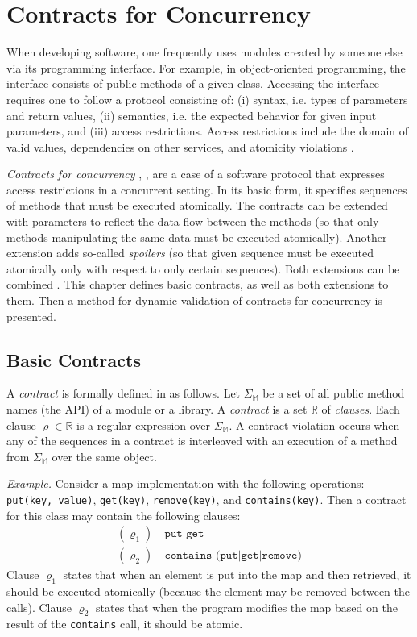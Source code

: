 \chapter{Contracts for Concurrency}
\label{chThree}

When developing software, one frequently uses modules created by someone else
via its programming interface. For example, in object-oriented programming, the
interface consists of public methods of a given class. Accessing the interface
requires one to follow a protocol consisting of: (i) syntax, i.e. types of
parameters and return values, (ii) semantics, i.e. the expected behavior for
given input parameters, and (iii) access restrictions. Access restrictions
include the domain of valid values, dependencies on other services, and
atomicity violations \cite{contracts}.

\emph{Contracts for concurrency} \cite{FITPUB10817},
\cite{DBLP:journals/corr/SousaDFL15}, are a case of a software protocol that
expresses access restrictions in a concurrent setting. In its basic form, it
specifies sequences of methods that must be executed atomically. The contracts
can be extended with parameters to reflect the data flow between the methods (so
that only methods manipulating the same data must be executed atomically).
Another extension adds so-called \emph{spoilers} (so that given sequence must be
executed atomically only with respect to only certain sequences). Both
extensions can be combined \cite{contracts}. This chapter defines basic
contracts, as well as both extensions to them. Then a method for dynamic
validation of contracts for concurrency is presented.

\section{Basic Contracts}
\label{basicContracts}

A \emph{contract} is formally defined in \cite{FITPUB10817} as follows. Let
$\Sigma_\mathbb{M}$ be a set of all public method names (the API) of a module or
a library. A \emph{contract} is a set $\mathbb{R}$ of \emph{clauses}. Each
clause $\varrho \in \mathbb{R}$ is a regular expression over
$\Sigma_\mathbb{M}$. A contract violation occurs when any of the sequences in a
contract is interleaved with an execution of a method from $\Sigma_\mathbb{M}$
over the same object.

\emph{Example.} Consider a map implementation with the following operations:
\texttt{put(key, value)}, \texttt{get(key)}, \texttt{remove(key)}, and
\texttt{contains(key)}. Then a contract for this class may contain the following
clauses:
\begin{align*}
    (\varrho_1) &\ \texttt{put get}\\
    (\varrho_2) &\ \texttt{contains (put|get|remove)}
\end{align*}
Clause $\varrho_1$ states that when an element is put into the map and then
retrieved, it should be executed atomically (because the element may be removed
between the calls). Clause $\varrho_2$ states that when the program modifies the
map based on the result of the \texttt{contains} call, it should be atomic.

